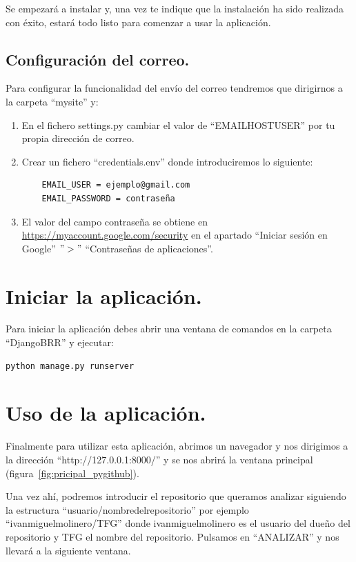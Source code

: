 \documentclass[a4paper, 12pt]{book}
\begin{document}
Se empezará a instalar y, una vez te indique que la instalación ha sido realizada con éxito, estará todo listo para comenzar a usar la aplicación.

\subsection{Configuración del correo.}

Para configurar la funcionalidad del envío del correo tendremos que dirigirnos a la carpeta ``mysite'' y:

\begin{enumerate}
	\item En el fichero settings.py cambiar el valor de ``EMAIL\textunderscore HOST\textunderscore USER'' por tu propia dirección de correo.
	\item Crear un fichero ``credentials.env'' donde introduciremos lo siguiente:
	\begin{verbatim}
	EMAIL_USER = ejemplo@gmail.com
	EMAIL_PASSWORD = contraseña
	\end{verbatim}
	\item El valor del campo contraseña se obtiene en \url{https://myaccount.google.com/security} en el apartado ``Iniciar sesión en Google'' $">"$ ``Contraseñas de aplicaciones''.
\end{enumerate}

\section{Iniciar la aplicación.}

Para iniciar la aplicación debes abrir una ventana de comandos en la carpeta ``Django\textunderscore BRR'' y ejecutar:

\begin{verbatim}
python manage.py runserver
\end{verbatim}

\section{Uso de la aplicación.}

Finalmente para utilizar esta aplicación, abrimos un navegador y nos dirigimos a la dirección ``http://127.0.0.1:8000/'' y se nos abrirá la ventana principal (figura~\ref{fig:pricipal_pygithub}).

Una vez ahí, podremos introducir el repositorio que queramos analizar siguiendo la estructura ``usuario/nombre\textunderscore del\textunderscore repositorio'' por ejemplo ``ivanmiguelmolinero/TFG'' donde ivanmiguelmolinero es el usuario del dueño del repositorio y TFG el nombre del repositorio. Pulsamos en ``ANALIZAR'' y nos llevará a la siguiente ventana.
\end{document}
